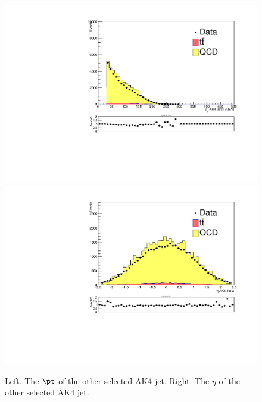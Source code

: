 \begin{figure}[thb!]
\begin{center}
\includegraphics[scale=0.34]{Figures/ratMCptJ2.pdf}
\includegraphics[scale=0.34]{Figures/ratMCetaJ2.pdf}\\
\end{center}
\caption{Left. The $\pt$ of the other selected AK4 jet. Right. The $\eta$ of the other selected AK4 jet.}
\label{fig:dMCAK42pteta}
\end{figure} 

